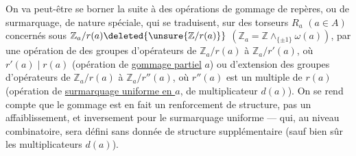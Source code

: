 
On va peut-être se borner  la suite à des opérations de gommage de repères, ou de surmarquage, de nature spéciale, qui se traduisent, sur  des torseurs $R_a$ $(a\in A)$ concernés sous
$\mathbb Z_a/r(a)\deleted{\unsure{\mathbb Z/r(a)}}$
$(\mathbb Z_a=\mathbb Z\mathbin{\wedge}_{\{\pm1\}}\omega(a))$,
par une opération de  des groupes d'opérateurs de $\mathbb Z_a/r(a)$ à $\mathbb Z_a/r'(a)$, où $r'(a)\mid r(a)$
(opération de \uline{gommage partiel}   $a$)
ou d'extension des groupes d'opérateurs de $\mathbb Z_a/r(a)$ à $\mathbb Z_a/r''(a)$, où $r''(a)$  est un multiple de $r(a)$
(opération de \uline{surmarquage uniforme en $a$}, \deleted{)} de multiplicateur $d(a)$).
On se rend compte  que le gommage  est en fait un renforcement de structure, pas un affaiblissement, et inversement pour le surmarquage uniforme --- qui, au niveau combinatoire, sera défini sans donnée de structure supplémentaire (sauf bien sûr les multiplicateurs $d(a)$).
